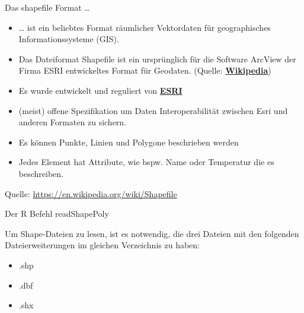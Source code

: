 \documentclass[ignorenonframetext,]{beamer}
\providecommand{\tightlist}{%
  \setlength{\itemsep}{0pt}\setlength{\parskip}{0pt}}
\begin{document}
\begin{frame}{Das shapefile Format \ldots{}}
\protect\hypertarget{das-shapefile-format}{}

\begin{itemize}
\item
  \ldots{} ist ein beliebtes Format räumlicher Vektordaten für
  geographisches Informationssysteme (GIS).
\item
  Das Dateiformat Shapefile ist ein ursprünglich für die Software
  ArcView der Firma ESRI entwickeltes Format für Geodaten. (Quelle:
  \href{https://de.wikipedia.org/wiki/Shapefile}{\textbf{Wikipedia}})
\item
  Es wurde entwickelt und reguliert von
  \href{http://www.esri.com/}{\textbf{ESRI}}
\item
  (meist) offene Spezifikation um Daten Interoperabilität zwischen Esri
  und anderen Formaten zu sichern.
\item
  Es können Punkte, Linien und Polygone beschrieben werden
\item
  Jedes Element hat Attribute, wie bspw. Name oder Temperatur die es
  beschreiben.
\end{itemize}

Quelle: \url{https://en.wikipedia.org/wiki/Shapefile}

\end{frame}

\begin{frame}{Der R Befehl readShapePoly}
\protect\hypertarget{der-r-befehl-readshapepoly}{}

Um Shape-Dateien zu lesen, ist es notwendig, die drei Dateien mit den
folgenden Dateierweiterungen im gleichen Verzeichnis zu haben:

\begin{itemize}
\tightlist
\item
  .shp
\item
  .dbf
\item
  .shx
\end{itemize}

\end{frame}
\end{document}
